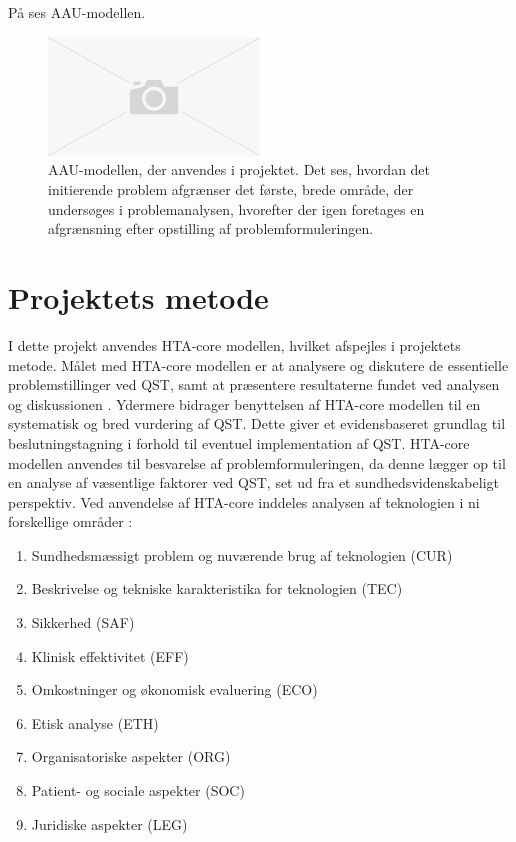 På  ses AAU-modellen. 

\begin{figure}[H] 
	\begin{center}
		\includegraphics[width=0.5\textwidth]{figures/cMetode/AAUmodel}
	\end{center}
	\caption{AAU-modellen, der anvendes i projektet. Det ses, hvordan det initierende problem afgrænser det første, brede område, der undersøges i problemanalysen, hvorefter der igen foretages en afgrænsning efter opstilling af problemformuleringen.} 
	\label{fig:AAUmodel} 
\end{figure}


\section{Projektets metode}
I dette projekt anvendes HTA-core modellen, hvilket afspejles i projektets metode. Målet med HTA-core modellen er at analysere og diskutere de essentielle problemstillinger ved QST, samt at præsentere resultaterne fundet ved analysen og diskussionen \citep{HTAcore}. Ydermere bidrager benyttelsen af HTA-core modellen til en systematisk og bred vurdering af QST. Dette giver et evidensbaseret grundlag til beslutningstagning i forhold til eventuel implementation af QST. \citep{mtvhaandbog2007} \citep{HTAcore} HTA-core modellen anvendes til besvarelse af problemformuleringen, da denne lægger op til en analyse af væsentlige faktorer ved QST, set ud fra et sundhedsvidenskabeligt perspektiv. Ved anvendelse af HTA-core inddeles analysen af teknologien i ni forskellige områder \citep{HTAcore}:

\begin{enumerate}
\item Sundhedsmæssigt problem og nuværende brug af teknologien (CUR)
\item Beskrivelse og tekniske karakteristika for teknologien (TEC)
\item Sikkerhed (SAF)
\item Klinisk effektivitet (EFF)
\item Omkostninger og økonomisk evaluering (ECO)
\item Etisk analyse (ETH)
\item Organisatoriske aspekter (ORG)
\item Patient- og sociale aspekter (SOC)
\item Juridiske aspekter (LEG)
\end{enumerate}

